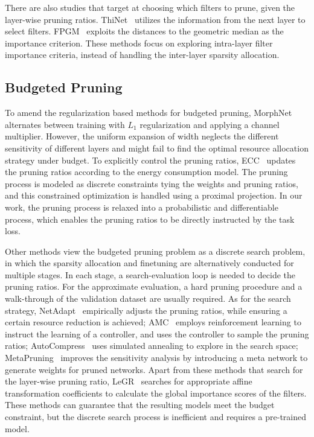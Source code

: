 \documentclass[runningheads]{llncs}
\begin{document}
  
  There are also studies that target at choosing which filters to prune, given the layer-wise pruning ratios. ThiNet~\cite{luo2017thinet} utilizes the information from the next layer to select filters. 
  FPGM~\cite{fpgm} exploits the distances to the geometric median as the importance criterion. These methods focus on exploring intra-layer filter importance criteria, instead of handling the inter-layer sparsity allocation.

  
  \subsection{Budgeted Pruning}
  
  To amend the regularization based methods for budgeted pruning, MorphNet~\cite{morphnet} alternates between training with $L_1$ regularization and applying a channel multiplier. 
  However, the uniform expansion of width neglects the different sensitivity of different layers and might fail to find the optimal resource allocation strategy under budget. To explicitly control the pruning ratios, ECC~\cite{ecc}
  updates the pruning ratios according to the energy consumption model. The pruning process is modeled as discrete constraints tying the weights and pruning ratios, and this constrained optimization is handled using a proximal projection. In our work, the pruning process is relaxed into a probabilistic and differentiable process, which enables the pruning ratios to be directly instructed by the task loss.
  
  Other methods view the budgeted pruning problem as a discrete search problem, in which the sparsity allocation and finetuning are alternatively conducted for multiple stages. In each stage, a search-evaluation loop is needed to decide the pruning ratios. 
  For the approximate evaluation, a hard pruning procedure and a walk-through of the validation dataset are usually required. 
  As for the search strategy, NetAdapt~\cite{netadapt} empirically adjusts the pruning ratios, while ensuring a certain resource reduction is achieved;
  AMC~\cite{amc} employs reinforcement learning to instruct the learning of a controller, and uses the controller to sample the pruning ratios; AutoCompress~\cite{autocompress} uses simulated annealing to explore in the search space; 
  MetaPruning~\cite{liu2019metapruning} improves the sensitivity analysis by introducing a meta network to generate weights for pruned networks.
  Apart from these methods that search for the layer-wise pruning ratio,  LeGR~\cite{legr} searches for appropriate affine transformation coefficients to calculate the global importance scores of the filters.
  These methods can guarantee that the resulting models meet the budget constraint, but the discrete search process is inefficient and requires a pre-trained model.
  
\end{document}
